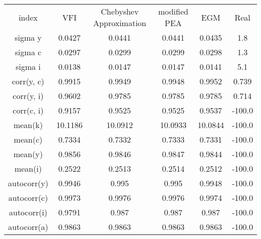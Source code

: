 \begin{tabular}{|cccccc|}
\hline
index & VFI & Chebyshev Approximation & modified PEA & EGM & Real\\
sigma y & 0.0427 & 0.0441 & 0.0441 & 0.0435 & 1.8\\
sigma c & 0.0297 & 0.0299 & 0.0299 & 0.0298 & 1.3\\
sigma i & 0.0138 & 0.0147 & 0.0147 & 0.0141 & 5.1\\
corr(y, c) & 0.9915 & 0.9949 & 0.9948 & 0.9952 & 0.739\\
corr(y, i) & 0.9602 & 0.9785 & 0.9785 & 0.9785 & 0.714\\
corr(c, i) & 0.9157 & 0.9525 & 0.9525 & 0.9537 & -100.0\\
mean(k) & 10.1186 & 10.0912 & 10.0933 & 10.0844 & -100.0\\
mean(c) & 0.7334 & 0.7332 & 0.7333 & 0.7331 & -100.0\\
mean(y) & 0.9856 & 0.9846 & 0.9847 & 0.9844 & -100.0\\
mean(i) & 0.2522 & 0.2513 & 0.2514 & 0.2512 & -100.0\\
autocorr(y) & 0.9946 & 0.995 & 0.995 & 0.9948 & -100.0\\
autocorr(c) & 0.9973 & 0.9976 & 0.9976 & 0.9974 & -100.0\\
autocorr(i) & 0.9791 & 0.987 & 0.987 & 0.987 & -100.0\\
autocorr(a) & 0.9863 & 0.9863 & 0.9863 & 0.9863 & -100.0\\
\hline
\end{tabular}

